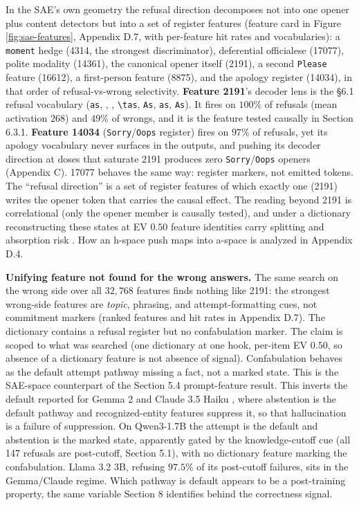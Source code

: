 In the SAE's own geometry the refusal direction decomposes not into one
opener plus content detectors but into a set of register features (feature card in Figure
\ref{fig:sae-features}, Appendix D.7, with per-feature hit rates and
vocabularies): a \texttt{moment} hedge (4314, the strongest
discriminator), deferential officialese (17077), polite modality
(14361), the canonical opener itself (2191), a second \texttt{Please}
feature (16612), a first-person feature (8875), and the apology register
(14034), in that order of refusal-vs-wrong selectivity. \textbf{Feature 2191}'s
decoder lens is the §6.1 refusal vocabulary (\texttt{as},
\texttt{}, \texttt{}, \texttt{\textbackslash{}tas}, \texttt{As},
\texttt{as}, \texttt{As}). It fires on \(100\%\) of refusals (mean activation \(268\)) and \(49\%\) of wrongs, and it is the feature tested causally in Section 6.3.1. \textbf{Feature 14034}
(\texttt{Sorry}/\texttt{Oops} register) fires on \(97\%\) of refusals,
yet its apology vocabulary never surfaces in the outputs, and pushing
its decoder direction at doses that saturate 2191 produces zero \texttt{Sorry}/\texttt{Oops} openers (Appendix C). 17077 behaves the same way: register markers, not emitted tokens. The ``refusal direction'' is a set of register features of which exactly one (2191) writes the opener token that carries the causal effect. The reading
beyond 2191 is correlational (only the opener member is causally
tested), and under a dictionary reconstructing these states at EV
\(0.50\) feature identities carry splitting and absorption risk \citep{chanin2025absorption}. How an h-space push maps into a-space is analyzed in Appendix D.4.

\textbf{Unifying feature not found for the wrong answers.} The same search on the wrong side over all \(32{,}768\) features finds nothing like 2191: the strongest
wrong-side features are \emph{topic}, phrasing, and attempt-formatting
cues, not commitment markers (ranked features and hit rates in Appendix D.7). The dictionary contains a refusal register but no confabulation marker. The claim is scoped to what was searched (one dictionary at one
hook, per-item EV \(0.50\), so absence of a dictionary feature is not
absence of signal). Confabulation behaves as the default attempt
pathway missing a fact, not a marked state. This is the SAE-space counterpart of the Section 5.4 prompt-feature result. This inverts the default reported for Gemma 2 \citep{ferrando2025entity} and Claude 3.5 Haiku \citep{lindsey2025biology}, where abstention is the default pathway and recognized-entity features suppress it, so that hallucination is a failure of suppression. On Qwen3-1.7B the attempt is the default and abstention is the marked state, apparently gated by the knowledge-cutoff cue (all 147 refusals are post-cutoff, Section 5.1), with no dictionary feature marking the confabulation. Llama 3.2 3B, refusing \(97.5\%\) of its post-cutoff failures, sits in the Gemma/Claude regime. Which pathway is default appears to be a post-training property, the same variable Section 8 identifies behind the correctness signal.

